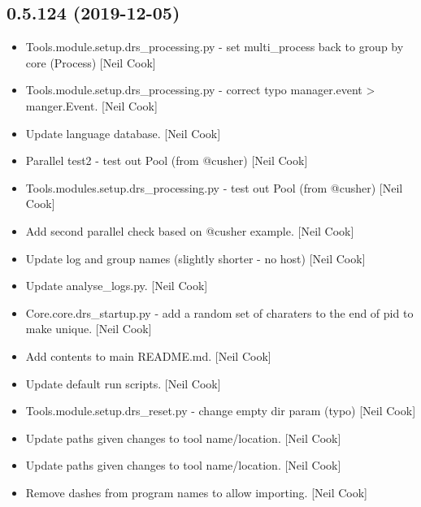 \documentclass[a4paper,10pt,english]{report}
\begin{document}
\subsection{0.5.124 (2019-12-05)}
\label{\detokenize{misc/changelog:id17}}\begin{itemize}
\item {} 
Tools.module.setup.drs\_processing.py - set multi\_process back to group
by core (Process) {[}Neil Cook{]}

\item {} 
Tools.module.setup.drs\_processing.py - correct typo manager.event \textendash{}\textgreater{}
manger.Event. {[}Neil Cook{]}

\item {} 
Update language database. {[}Neil Cook{]}

\item {} 
Parallel test2 - test out Pool (from @cusher) {[}Neil Cook{]}

\item {} 
Tools.modules.setup.drs\_processing.py - test out Pool (from @cusher)
{[}Neil Cook{]}

\item {} 
Add second parallel check based on @cusher example. {[}Neil Cook{]}

\item {} 
Update log and group names (slightly shorter - no host) {[}Neil Cook{]}

\item {} 
Update analyse\_logs.py. {[}Neil Cook{]}

\item {} 
Core.core.drs\_startup.py - add a random set of charaters to the end of
pid to make unique. {[}Neil Cook{]}

\item {} 
Add contents to main README.md. {[}Neil Cook{]}

\item {} 
Update default run scripts. {[}Neil Cook{]}

\item {} 
Tools.module.setup.drs\_reset.py - change empty dir param (typo) {[}Neil
Cook{]}

\item {} 
Update paths given changes to tool name/location. {[}Neil Cook{]}

\item {} 
Update paths given changes to tool name/location. {[}Neil Cook{]}

\item {} 
Remove dashes from program names to allow importing. {[}Neil Cook{]}

\end{itemize}
\end{document}
